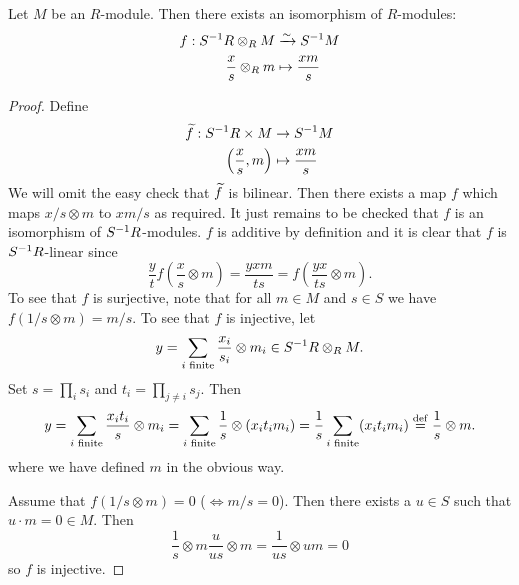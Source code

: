 \begin{prop}
  Let $M$ be an $R$-module.
  Then there exists an isomorphism of $R$-modules:
  \begin{align*}
    f: S^{-1} R \otimes_R M &\xrightarrow{\sim} S^{-1} M \\
    \frac{x}{s} \otimes_R m &\mapsto \frac{xm}{s}
  \end{align*}
\end{prop}

\begin{proof}
  Define
  \begin{align*}
    \widetilde f: S^{-1} R \times M &\to S^{-1} M \\
    \left( \frac{x}{s}, m \right) &\mapsto \frac{xm}{s}
  \end{align*}
  We will omit the easy check that $\widetilde f$ is bilinear.
  Then there exists a map $f$ which maps $x/s \otimes m$ to $xm/s$ as required.
  It just remains to be checked that $f$ is an isomorphism of $S^{-1} R$-modules.
  $f$ is additive by definition and it is clear that $f$ is $S^{-1} R$-linear since
  \[\frac{y}{t} f \left( \frac{x}{s} \otimes m \right) = \frac{yxm}{ts} = f \left( \frac{yx}{ts} \otimes m \right).\]
  To see that $f$ is surjective, note that for all $m \in M$ and $s \in S$ we have $f(1/s \otimes m) = m/s$.
  To see that $f$ is injective, let
  \[y = \sum_{i \text{ finite}} \frac{x_i}{s_i} \otimes m_i \in S^{-1} R \otimes_R M.\]
  Set $s=\prod_i s_i$ and $t_i = \prod_{j \neq i} s_j$.
  Then
  \[y = \sum_{i \text{ finite}} \frac{x_it_i}{s} \otimes m_i = \sum_{i \text{ finite}} \frac{1}{s} \otimes (x_it_im_i) = \frac{1}{s} \sum_{i \text{ finite}} (x_it_im_i) \overset{\mathrm{def}}{=} \frac{1}{s} \otimes m.\]
  where we have defined $m$ in the obvious way.

  Assume that $f(1/s \otimes m)=0$ ($\iff m/s=0$).
  Then there exists a $u \in S$ such that $u \cdot m = 0 \in M$.
  Then
  \[\frac{1}{s} \otimes m \frac{u}{us} \otimes m = \frac{1}{us} \otimes um = 0\]
  so $f$ is injective.
\end{proof}

